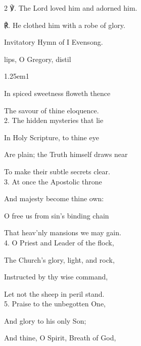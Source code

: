 \begin{paracol}{2}
    ℣. The Lord loved him and adorned him.

	℟. He clothed him with a robe of glory.


\switchcolumn

\vspace{-1\baselineskip}

\mattins\label{GregoryMattins}

\begin{rubric}
	Invitatory Hymn of I Evensong.
\end{rubric}

\mattinsOfficeHymn

 lips, O Gregory, distil

\begin{hangparas}{1.25em}{1}

In spiced sweetness floweth thence

The savour of thine eloquence.\\

2. The hidden mysteries that lie

In Holy Scripture, to thine eye

Are plain; the Truth himself draws near

To make their subtle secrets clear.\\

3. At once the Apostolic throne

And majesty become thine own:

O free us from sin's binding chain

That heav'nly mansions we may gain.\\

4. O Priest and Leader of the flock,

The Church's glory, light, and rock,

Instructed by thy wise command,

Let not the sheep in peril stand.\\

5. Praise to the unbegotten One,

And glory to his only Son;

And thine, O Spirit, Breath of God,


\end{hangparas}
\end{paracol}
